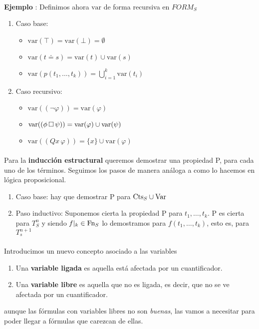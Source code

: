 \paragraph{}
\addtocounter{ej}{1} %
\textbf{Ejemplo }: Definimos ahora $\mbox{var}$ de forma recursiva en $FORM_S$
\begin{enumerate}
    \item Caso base:
    \begin{itemize}
    	\item $\mbox{var}(\top) = \mbox{var}(\bot) = \emptyset$
		\item $\mbox{var}(t \doteq s) = \mbox{var}(t) \cup \mbox{var}(s)$            
        \item $\mbox{var}(p(t_1, \dots, t_k)) = \bigcup_{i=1}^{k} \mbox{var}(t_i)$
    \end{itemize} 
    \item Caso recursivo:
    \begin{itemize}
        \item $\mbox{var}((\neg \varphi)) = \mbox{var}(\varphi)$
        \item $\mbox{var}((\phi \, \Box \, \psi)) = \mbox{var}(\varphi) \cup \mbox{var}(\psi)$
        \item $\mbox{var}((Qx \, \varphi)) = \{x\} \cup \mbox{var}(\varphi)$
    \end{itemize}
\end{enumerate}
\paragraph{}
Para la \textbf{inducción estructural} queremos demostrar una propiedad P, para cada uno de los términos. Seguimos los pasos de manera análoga a como lo hacemos en lógica proposicional. 
\begin{enumerate}
	\item Caso base: hay que demostrar P para $\mbox{Cts}_{S} \cup \mbox{Var}$
	\item Paso inductivo: Suponemos cierta la propiedad P para $t_1, \ldots, t_k$. P es cierta para $T_S^n$ y siendo $f\vert_{k} \in \mbox{Fn}_{S}$ lo demostramos para $f(t_1, \ldots, t_k)$, esto es, para $T_s^{n+1}$
\end{enumerate}
\paragraph{}  
\begin{definition}
Introducimos un nuevo concepto asociado a las variables
\begin{enumerate}
	\item Una \textbf{variable ligada} es aquella está afectada por un cuantificador. 
	\item Una \textbf{variable libre} es aquella que no es ligada, es decir, que no se ve afectada por un cuantificador. 
\end{enumerate}
aunque las fórmulas con variables libres no son \textit{buenas}, las vamos a necesitar para poder llegar a fórmulas que carezcan de ellas. 
\end{definition}
